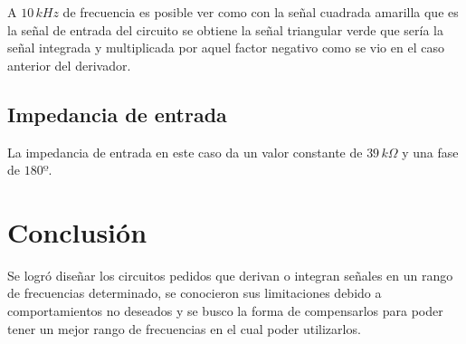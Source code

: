 \documentclass[11pt, a4paper]{article}
\begin{document}
A $10 \, kHz$ de frecuencia es posible ver como con la señal cuadrada amarilla que es la señal de entrada del circuito se obtiene la señal triangular verde que sería la señal integrada y multiplicada por aquel factor negativo como se vio en el caso anterior del derivador.

\subsection{Impedancia de entrada}
La impedancia de entrada en este caso da un valor constante de $39 \, k \Omega$ y una fase de $180º$.

\section{Conclusión}
Se logró diseñar los circuitos pedidos que derivan o integran señales en un rango de frecuencias determinado, se conocieron sus limitaciones debido a comportamientos no deseados y se busco la forma de compensarlos para poder tener un mejor rango de frecuencias en el cual poder utilizarlos.
\end{document}
